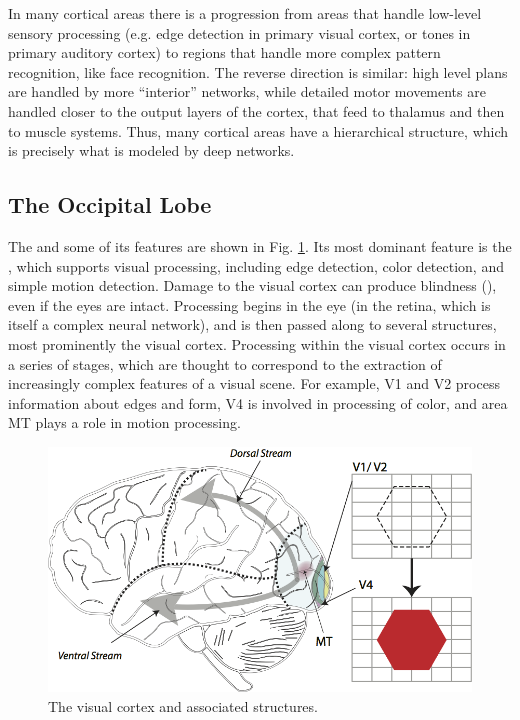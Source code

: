 In many cortical areas there is a progression from areas that handle low-level sensory processing (e.g. edge detection in primary visual cortex, or tones in primary auditory cortex) to regions that handle more complex pattern recognition, like face recognition. The reverse direction is similar: high level plans are handled by more ``interior'' networks, while detailed motor movements are handled closer to the output layers of the cortex, that feed to thalamus and then to muscle systems. Thus, many cortical areas have a hierarchical structure, which is precisely what is modeled by deep networks. 

\subsection{The Occipital Lobe}

The  and some of its features are shown in Fig. \ref{brain_vision}. Its most dominant feature is the , which supports visual processing, including edge detection, color detection, and simple motion detection. Damage to the visual cortex can produce blindness (), even if the eyes are intact. Processing begins in the eye (in the retina, which is itself a complex neural network), and is then passed along to several structures, most prominently the visual cortex. Processing within the visual cortex occurs in a series of stages, which are thought to correspond to the extraction of increasingly complex features of a visual scene. For example, V1 and V2  process information about edges and form, V4 is involved in processing of color, and area MT plays a role in motion processing. 

\begin{figure}[h]
\centering
\includegraphics[scale=.6]{./images/brain_vision.png}
\caption[Pamela Payne.]{The visual cortex and associated structures.}
\label{brain_vision}
\end{figure}

